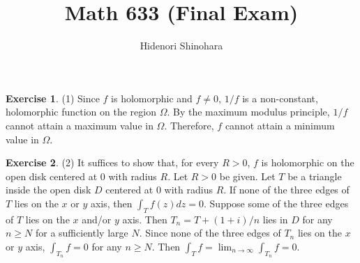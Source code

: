 \documentclass[12pt, psamsfonts]{amsart}
\theoremstyle{definition}
\newtheorem*{exer}{Exercise}
\theoremstyle{remark}
\numberwithin{equation}{section}
\begin{document}
\title{Math 633 (Final Exam)}
\author{Hidenori Shinohara}
\maketitle

\begin{exer}{(1)}
  Since $f$ is holomorphic and $f \ne 0$, $1 / f$ is a non-constant, holomorphic function on the region $\Omega$.
  By the maximum modulus principle, $1 / f$ cannot attain a maximum value in $\Omega$.
  Therefore, $f$ cannot attain a minimum value in $\Omega$.
\end{exer}

\begin{exer}{(2)}
  It suffices to show that, for every $R > 0$, $f$ is holomorphic on the open disk centered at 0 with radius $R$.
  Let $R > 0$ be given.
  Let $T$ be a triangle inside the open disk $D$ centered at 0 with radius $R$.
  If none of the three edges of $T$ lies on the $x$ or $y$ axis, then $\int_{T} f(z) dz = 0$.
  Suppose some of the three edges of $T$ lies on the $x$ and/or $y$ axis.
  Then $T_n = T + (1 + i) / n$ lies in $D$ for any $n \geq N$ for a sufficiently large $N$.
  Since none of the three edges of $T_n$ lies on the $x$ or $y$ axis, $\int_{T_n} f = 0$ for any $n \geq N$.
  Then $\int_{T} f = \lim_{n \rightarrow \infty} \int_{T_n} f = 0$.
\end{exer}
\end{document}
